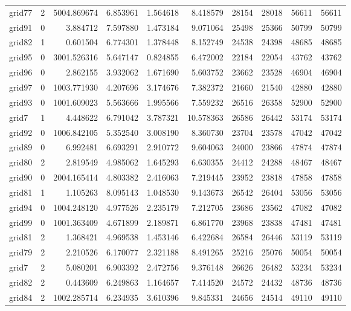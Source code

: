 \begin{longtable}{|l|r|r|r|r|r|r|r|r|r|}
grid77 & 2 & 5004.869674 & 6.853961 & 1.564618 & 8.418579 & 28154 & 28018 & 56611 & 56611 \\
grid91 & 0 & 3.884712 & 7.597880 & 1.473184 & 9.071064 & 25498 & 25366 & 50799 & 50799 \\
grid82 & 1 & 0.601504 & 6.774301 & 1.378448 & 8.152749 & 24538 & 24398 & 48685 & 48685 \\
grid95 & 0 & 3001.526316 & 5.647147 & 0.824855 & 6.472002 & 22184 & 22054 & 43762 & 43762 \\
grid96 & 0 & 2.862155 & 3.932062 & 1.671690 & 5.603752 & 23662 & 23528 & 46904 & 46904 \\
grid97 & 0 & 1003.771930 & 4.207696 & 3.174676 & 7.382372 & 21660 & 21540 & 42880 & 42880 \\
grid93 & 0 & 1001.609023 & 5.563666 & 1.995566 & 7.559232 & 26516 & 26358 & 52900 & 52900 \\
grid7 & 1 & 4.448622 & 6.791042 & 3.787321 & 10.578363 & 26586 & 26442 & 53174 & 53174 \\
grid92 & 0 & 1006.842105 & 5.352540 & 3.008190 & 8.360730 & 23704 & 23578 & 47042 & 47042 \\
grid89 & 0 & 6.992481 & 6.693291 & 2.910772 & 9.604063 & 24000 & 23866 & 47874 & 47874 \\
grid80 & 2 & 2.819549 & 4.985062 & 1.645293 & 6.630355 & 24412 & 24288 & 48467 & 48467 \\
grid90 & 0 & 2004.165414 & 4.803382 & 2.416063 & 7.219445 & 23952 & 23818 & 47858 & 47858 \\
grid81 & 1 & 1.105263 & 8.095143 & 1.048530 & 9.143673 & 26542 & 26404 & 53056 & 53056 \\
grid94 & 0 & 1004.248120 & 4.977526 & 2.235179 & 7.212705 & 23686 & 23562 & 47082 & 47082 \\
grid99 & 0 & 1001.363409 & 4.671899 & 2.189871 & 6.861770 & 23968 & 23838 & 47481 & 47481 \\
grid81 & 2 & 1.368421 & 4.969538 & 1.453146 & 6.422684 & 26584 & 26446 & 53119 & 53119 \\
grid79 & 2 & 2.210526 & 6.170077 & 2.321188 & 8.491265 & 25216 & 25076 & 50054 & 50054 \\
grid7 & 2 & 5.080201 & 6.903392 & 2.472756 & 9.376148 & 26626 & 26482 & 53234 & 53234 \\
grid82 & 2 & 0.443609 & 6.249863 & 1.164657 & 7.414520 & 24572 & 24432 & 48736 & 48736 \\
grid84 & 2 & 1002.285714 & 6.234935 & 3.610396 & 9.845331 & 24656 & 24514 & 49110 & 49110 \\

\end{longtable}
